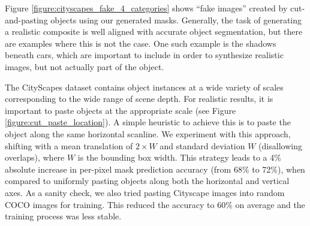 \documentclass[runningheads]{llncs}
\begin{document}

Figure \ref{figure:cityscapes_fake_4_categories} shows ``fake images'' created by cut-and-pasting objects using our generated masks.
Generally, the task of generating a realistic composite is well aligned with accurate object segmentation, but there are examples where this is not the case. One such example is the shadows beneath cars, which are important to include in order to synthesize realistic images, but not actually part of the object.


The CityScapes dataset contains object instances at a wide variety of scales corresponding to the wide range of scene depth. For realistic results, it is important to paste objects at the appropriate scale (see Figure \ref{figure:cut_paste_location}). A simple heuristic to achieve this is to paste the object along the same horizontal scanline. We experiment with this approach, shifting with a mean translation of $2\times W$ and standard deviation $W$ (disallowing overlaps), where $W$ is the bounding box width.  This strategy leads to a 4\% absolute increase in per-pixel mask prediction accuracy (from 68\%
to 72\%), when compared to uniformly pasting objects along both the
horizontal and vertical axes. As a sanity check, we also tried pasting Cityscape images into random COCO images for training. This reduced the accuracy to $60\%$ on average and the training process was less stable.
\end{document}
